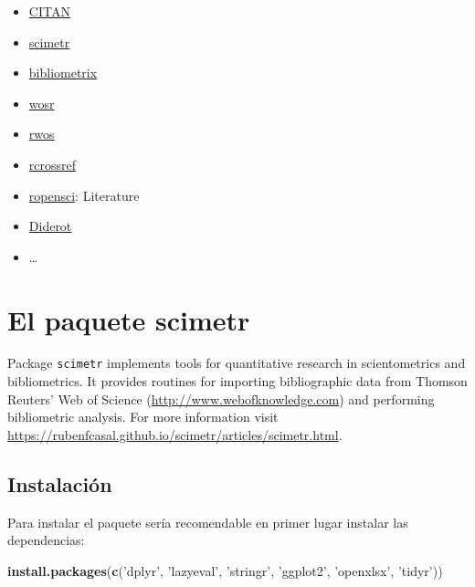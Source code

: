 \documentclass[]{book}
\newenvironment{Shaded}{\begin{snugshade}}{\end{snugshade}}
\newcommand{\KeywordTok}[1]{\textcolor[rgb]{0.13,0.29,0.53}{\textbf{#1}}}
\newcommand{\NormalTok}[1]{#1}
\newcommand{\StringTok}[1]{\textcolor[rgb]{0.31,0.60,0.02}{#1}}
\begin{document}
\begin{itemize}
\item
  \href{https://cran.r-project.org/web/packages/CITAN/index.html}{CITAN}
\item
  \href{https://rubenfcasal.github.io/scimetr/index.html}{scimetr}
\item
  \href{http://www.bibliometrix.org}{bibliometrix}
\item
  \href{https://vt-arc.github.io/wosr/index.html}{wosr}
\item
  \href{https://github.com/juba/rwos}{rwos}
\item
  \href{https://docs.ropensci.org/rcrossref}{rcrossref}
\item
  \href{https://ropensci.org/packages/}{ropensci}: Literature
\item
  \href{https://cran.r-project.org/web/packages/Diderot/index.html}{Diderot}
\item
  \ldots{}
\end{itemize}

\hypertarget{scimetr}{%
\chapter{El paquete scimetr}\label{scimetr}}

Package \texttt{scimetr} implements tools for quantitative research in scientometrics and bibliometrics.
It provides routines for importing bibliographic data from Thomson Reuters' Web of Science (\url{http://www.webofknowledge.com}) and performing bibliometric analysis. For more information visit \url{https://rubenfcasal.github.io/scimetr/articles/scimetr.html}.

\hypertarget{instalacion}{%
\section{Instalación}\label{instalacion}}

Para instalar el paquete sería recomendable en primer lugar instalar las dependencias:

\begin{Shaded}
\begin{Highlighting}[]
\KeywordTok{install.packages}\NormalTok{(}\KeywordTok{c}\NormalTok{(}\StringTok{'dplyr'}\NormalTok{, }\StringTok{'lazyeval'}\NormalTok{, }\StringTok{'stringr'}\NormalTok{, }\StringTok{'ggplot2'}\NormalTok{, }\StringTok{'openxlsx'}\NormalTok{, }\StringTok{'tidyr'}\NormalTok{))}
\end{Highlighting}
\end{Shaded}
\end{document}
